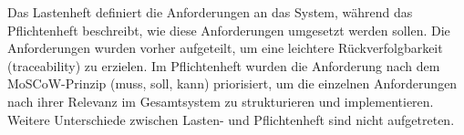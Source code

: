 Das Lastenheft definiert die Anforderungen an das System, während das Pflichtenheft beschreibt,
wie diese Anforderungen umgesetzt werden sollen.
Die Anforderungen wurden vorher aufgeteilt, um eine leichtere Rückverfolgbarkeit (traceability) zu erzielen.
Im Pflichtenheft wurden die Anforderung nach dem MoSCoW-Prinzip (muss, soll, kann) priorisiert, um die einzelnen Anforderungen
nach ihrer Relevanz im Gesamtsystem zu strukturieren und implementieren.
Weitere Unterschiede zwischen Lasten- und Pflichtenheft sind nicht aufgetreten.